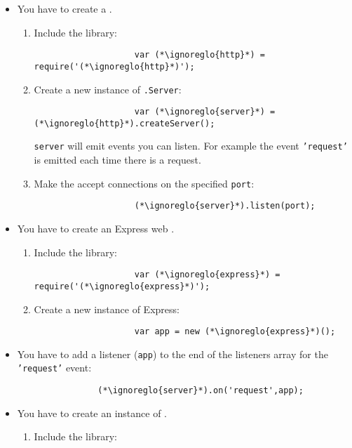 		\begin{itemize}
			\item You have to create a  .
			\begin{enumerate}
				\item Include the library:
				\begin{lstlisting}
					var (*\ignoreglo{http}*) = require('(*\ignoreglo{http}*)');
				\end{lstlisting}
				\item Create a new instance of \texttt{.Server}:
				\begin{lstlisting}
					var (*\ignoreglo{server}*) = (*\ignoreglo{http}*).createServer();
				\end{lstlisting}
				\texttt{server} will emit events you can listen. For example the event \texttt{'request'} is emitted each time there is a request.
				\item Make the   accept connections on the specified \texttt{port}:
				\begin{lstlisting}
					(*\ignoreglo{server}*).listen(port);
				\end{lstlisting}
			\end{enumerate}
			\item You have to create an Express web .
			\begin{enumerate}
				\item Include the library:
				\begin{lstlisting}
					var (*\ignoreglo{express}*) = require('(*\ignoreglo{express}*)');
				\end{lstlisting}
				\item Create a new instance of Express:
				\begin{lstlisting}
					var app = new (*\ignoreglo{express}*)();
				\end{lstlisting}
			\end{enumerate}
			\item You have to add a listener (\texttt{app}) to the end of the listeners array for the \texttt{'request'} event:
			\begin{lstlisting}
				(*\ignoreglo{server}*).on('request',app);
			\end{lstlisting}
			\item You have to create an instance of .
			\begin{enumerate}
				\item Include the library:

\end{enumerate}
\end{itemize}
